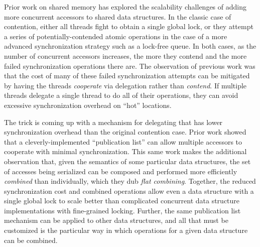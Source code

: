 Prior work on shared memory has explored the scalability challenges of adding more concurrent accessors to shared data structures.
In the classic case of contention, either all threads fight to obtain a single global lock, or they attempt a series of potentially-contended atomic operations in the case of a more advanced synchronization strategy such as a lock-free queue. In both cases, as the number of concurrent accessors increases, the more they contend and the more failed synchronization operations there are.
The observation of previous work was that the cost of many of these failed synchronization attempts can be mitigated by having the threads \emph{cooperate} via delegation rather than \emph{contend}.
If multiple threads delegate a single thread to do all of their operations, they can avoid excessive synchronization overhead on ``hot'' locations.

The trick is coming up with a mechanism for delegating that has lower synchronization overhead than the original contention case.
Prior work showed that a cleverly-implemented ``publication list'' can allow multiple accessors to cooperate with minimal synchronization.
This same work makes the additional observation that, given the semantics of some particular data structures, the set of accesses being serialized can be composed and performed more efficiently \emph{combined} than individually, which they dub \emph{flat combining}.
Together, the reduced synchronization cost and combined operations allow even a data structure with a single global lock to scale better than complicated concurrent data structure implementations with fine-grained locking.
Further, the same publication list mechanism can be applied to other data structures, and all that must be customized is the particular way in which operations for a given data structure can be combined.


